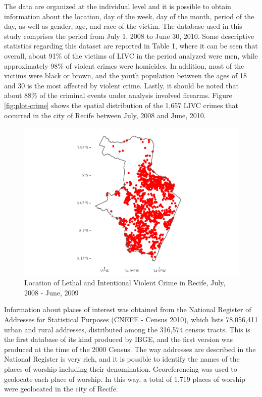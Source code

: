 \documentclass[smallextended]{svjour3}       %
\begin{document}
The data are organized at the individual level and it is possible to
obtain information about the location, day of the week, day of the
month, period of the day, as well as gender, age, and race of the
victim. The database used in this study comprises the period from July
1, 2008 to June 30, 2010. Some descriptive statistics regarding this
dataset are reported in Table 1, where it can be seen that overall,
about 91\% of the victims of LIVC in the period analyzed were men, while
approximately 98\% of violent crimes were homicides. In addition, most
of the victims were black or brown, and the youth population between the
ages of 18 and 30 is the most affected by violent crime. Lastly, it
should be noted that about 88\% of the criminal events under analysis
involved firearms. Figure \ref{fig:plot-crime} shows the spatial
distribution of the 1,657 LIVC crimes that occurred in the city of
Recife between July, 2008 and June, 2010.

\begin{figure}

\includegraphics{Moral_Communities_and_Crime_v1_files/figure-latex/fig-plot-crime-1} \hfill{}

\caption{\label{fig:plot-crime}Location of Lethal and Intentional Violent Crime in Recife, July, 2008 - June, 2009}\label{fig:fig-plot-crime}
\end{figure}

Information about places of interest was obtained from the National
Register of Addresses for Statistical Purposes (CNEFE - Census 2010),
which lists 78,056,411 urban and rural addresses, distributed among the
316,574 census tracts. This is the first database of its kind produced
by IBGE, and the first version was produced at the time of the 2000
Census. The way addresses are described in the National Register is very
rich, and it is possible to identify the names of the places of worship
including their denomination. Georeferencing was used to geolocate each
place of worship. In this way, a total of 1,719 places of worship were
geolocated in the city of Recife.
\end{document}
